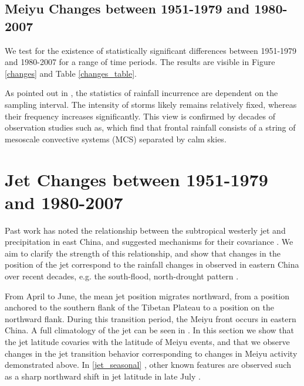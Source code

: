 \documentclass[draft,grl]{AGUTeX}
\begin{document}
\begin{article}
\subsection{Meiyu Changes between 1951-1979 and 1980-2007}
	
	We test for the existence of statistically significant differences between 1951-1979 and 1980-2007 for a range of time periods. The results are visible in Figure \ref{changes} and Table \ref{changes_table}.
	
	As pointed out in \citet{Biasutti2011}, the statistics of rainfall incurrence are dependent on the sampling interval. The intensity of storms likely remains relatively fixed, whereas their frequency increases significantly. This view is confirmed by decades of observation studies such as\citet{Murakami1984}, which find that frontal rainfall consists of a string of mesoscale convective systems (MCS) separated by calm skies.
	
\section{Jet Changes between 1951-1979 and 1980-2007}

	Past work has noted the relationship between the subtropical westerly jet and precipitation in east China, and suggested mechanisms for their covariance \citep{Molnar2010, Sampe2010, Chen2014}. We aim to clarify the strength of this relationship, and show that changes in the position of the jet correspond to the rainfall changes in observed in eastern China over recent decades, e.g. the south-flood, north-drought pattern \citep{Nigam2013}. 

	

From April to June, the mean jet position migrates northward, from a position anchored to the southern flank of the Tibetan Plateau to a position on the northward flank. During this transition period, the Meiyu front occurs in eastern China. A full climatology of the jet can be seen in \citet{Schiemann2009}. In this section we show that the jet latitude covaries with the latitude of Meiyu events, and that we observe changes in the jet transition behavior corresponding to changes in Meiyu activity demonstrated above. In \ref{jet_seasonal} , other known features are observed such as a sharp northward shift in jet latitude in late July \citep{Lin2008}.


\end{article}
\end{document}
